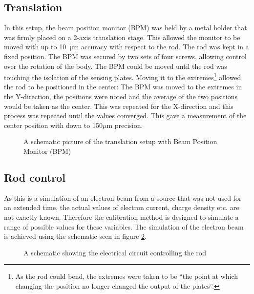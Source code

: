\subsection{Translation}
\label{sec:calibration/translation}
In this setup, the beam position monitor (BPM) was held by a metal holder that was firmly placed on a 2-axis translation stage. This allowed the monitor to be moved with up to \SI{10}{\micro\meter} accuracy with respect to the rod. The rod was kept in a fixed position.
The BPM was secured by two sets of four screws, allowing control over the rotation of the body. The BPM could be moved until the rod was touching the isolation of the sensing plates. Moving it to the extremes\footnote{As the rod could bend, the extremes were taken to be ``the point at which changing the position no longer changed the output of the plates''.} allowed the rod to be positioned in the center: 
The BPM was moved to the extremes in the Y-direction, the positions were noted and the average of the two positions would be taken as the center. This was repeated for the X-direction and this process was repeated until the values converged. This gave a measurement of the center position with down to 150$\mu$m precision.
\begin{figure}[H]
\centering

\caption{A schematic picture of the translation setup with Beam Position Monitor (BPM)}
\label{fig:schem_translation}
\end{figure}

\subsection{Rod control}
As this is a simulation of an electron beam from a source that was not used for an extended time, the actual values of electron current, charge density etc. are not exactly known. Therefore the calibration method is designed to simulate a range of possible values for these variables. 
The simulation of the electron beam is achieved using the schematic seen in figure \ref{fig:circuitsetup}. 

\begin{figure}[h]
\centering

\caption{A schematic showing the electrical circuit controlling the rod}
\label{fig:circuitsetup}
\end{figure}

